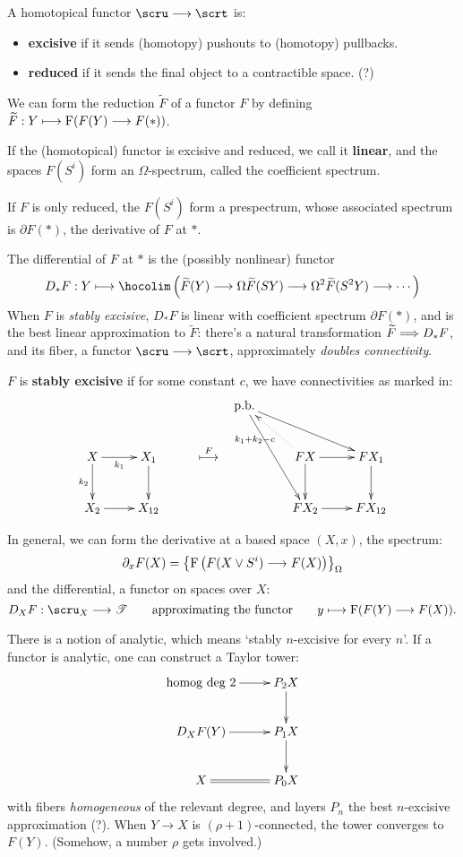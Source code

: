 \documentclass[11pt]{article}
\begin{document}
\begin{Calculus I}
\begin{itemise}
\setlength{\parindent}{.25in}
\item A homotopical functor $\scru\to\scrt$ is:
\begin{itemize}\squishlist
\setlength{\parindent}{.25in}
\item  \textbf{excisive} if it sends (homotopy) pushouts to (homotopy) pullbacks.
\item \textbf{reduced} if it sends the final object to a contractible space. (?)
\end{itemize}
\item We can  form the reduction $\widetilde{F}$ of a functor $F$ by defining $\widetilde{F}:Y\longmapsto\operatorname{F}(F(Y)\longrightarrow F(*))$.
\item If the (homotopical) functor is excisive and reduced, we call it \textbf{linear}, and the spaces $F(S^i)$ form an $\Omega$-spectrum, called the coefficient spectrum.
\item If $F$ is only reduced, the $F(S^i)$ form a prespectrum, whose associated spectrum is $\partial F(*)$, the derivative of $F$ at $*$.
\item The differential of $F$ at $*$ is the (possibly nonlinear) functor
\[D_*F:Y\mapsto\hocolim\left(\widetilde{F}(Y)\to\Omega\widetilde{F}(SY)\to\Omega^2\widetilde{F}(S^2Y)\to\cdots \right)\]
When $F$ is \emph{stably excisive}, $D_*F$ is linear with coefficient spectrum $\partial F(*)$, and is the best linear approximation to $\widetilde{F}$: there's a natural transformation $\widetilde{F}\Longrightarrow D_*F$, and its fiber, a functor $\scru\to\scrt$, approximately \emph{doubles connectivity}.

$F$ is \textbf{stably excisive} if for some constant $c$, we have connectivities as marked in:
\[\xymatrix{
&%
&%
&%
\textup{p.b.}
\ar[rrd]
\ar[rdd]
&%
&%
\\%
X\ar[r]_-{k_1}
\ar[d]_-{k_2}
&%
X_1
\ar[d]
&%
\makebox[0cm][l]{\,$\overset{F}{\mapsto}$}&%
&
FX
\ar@{..>}[ul]^-{k_1+k_2-c}
\ar[r]
\ar[d]
&%
FX_1
\ar[d]
\\%
X_2\ar[r]
&%
X_{12}
&%
&&%
FX_{2}
\ar[r]
&%
FX_{12}
}\]
\item In general, we can form the derivative at a based space $(X,x)$, the spectrum:
\[\partial_xF(X)= \left\{\operatorname{F}\left(F(X\vee S^i)\longrightarrow F(X)\right)\right\}_\Omega\]
and the differential, a functor on spaces over $X$:
\[D_XF:\scru_X\to\scrT\textup{\qquad approximating the functor\qquad }y\mapsto\fiber(F(Y)\to F(X)).\]
\item There is a notion of analytic, which means `stably $n$-excisive for every $n$'. If a functor is analytic, one can construct a Taylor tower:
\[\xymatrix{
\textup{homog deg 2}\ar[r]&\ar[d]P_2X\\
D_XF(Y)\ar[r]&\ar[d]P_1X\\
X\ar@{=}[r]
&P_0X
}
\]
with fibers \emph{homogeneous} of the relevant degree, and layers $P_n$ the best $n$-excisive approximation (?). When $Y\to X$ is $(\rho+1)$-connected, the tower converges to $F(Y)$. (Somehow, a number $\rho$ gets involved.)
\end{itemise}

\end{Calculus I}
\end{document}
